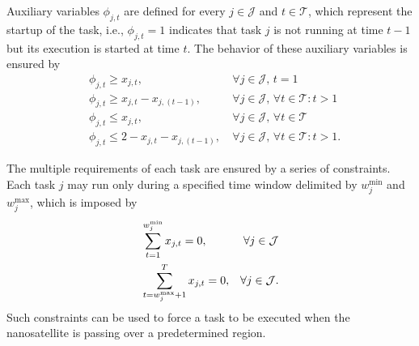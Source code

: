 Auxiliary variables $\phi_{j,t}$ are defined for every $j\in \mathcal{J}$ and $t\in \mathcal{T}$, which represent the startup of the task, i.e., $\phi_{j,t} = 1$ indicates that task $j$ is not running at time $t-1$ but its execution is started at time $t$.
The behavior of these auxiliary variables is ensured by
\begin{equation}\label{eq:phi-constraints}
    \begin{aligned}
	& \phi_{j,t} \geq x_{j,t}, &~\forall j\in\mathcal{J},\, t = 1  \\
        & \phi_{j,t} \geq x_{j,t} - x_{j,(t-1)}, &~\forall j\in\mathcal{J}, \,\forall t\in\mathcal{T}: t > 1   \\
        & \phi_{j,t} \leq x_{j,t}, &~\forall j\in\mathcal{J}, \,\forall t\in\mathcal{T}   \\
        & \phi_{j,t} \leq 2 - x_{j,t} - x_{j,(t-1)}, &~\forall j\in\mathcal{J}, \,\forall t\in\mathcal{T}: t > 1
    .\end{aligned}
\end{equation}

The multiple requirements of each task are ensured by a series of constraints.
Each task $j$ may run only during a specified time window delimited by $w_{j}^{\text{min}}$ and $w_{j}^{\text{max}}$, which is imposed by
\begin{equation}\label{eq:window-constraints}
    \begin{aligned}
        &\sum_{t=1}^{\textcolor{black}{w^{\min}_{j}}} x_{j,t} = 0,  & \forall j\in\mathcal{J} \\
        &\sum_{t=w^{\max}_{j}+1}^{T} x_{j,t} = 0, & \forall j\in\mathcal{J}
    .\end{aligned}
\end{equation}
Such constraints can be used to force a task to be executed when the nanosatellite is passing over a predetermined region.

